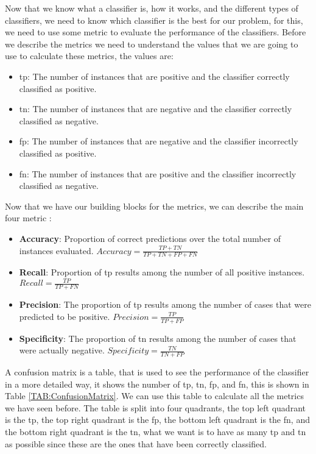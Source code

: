 Now that we know what a classifier is, how it works, and the different types of classifiers, we need to know which classifier is the best for our problem, for this, we need to use some metric to evaluate the performance of the classifiers. Before we describe the metrics we need to understand the values that we are going to use to calculate these metrics, the values are:


\begin{itemize}
    \item \ac{tp}: The number of instances that are positive and the classifier correctly classified as positive.
    \item \ac{tn}: The number of instances that are negative and the classifier correctly classified as negative.
    \item \ac{fp}: The number of instances that are negative and the classifier incorrectly classified as positive.
    \item \ac{fn}: The number of instances that are positive and the classifier incorrectly classified as negative.
\end{itemize}

Now that we have our building blocks for the metrics, we can describe the main four metric \cite{m_review_2015}:


\begin{itemize}
    \item \textbf{Accuracy}: Proportion of correct predictions over the total number of instances evaluated. $Accuracy = \frac{TP + TN}{TP + TN + FP + FN}$
    \item \textbf{Recall}: Proportion of \ac{tp} results among the number of all positive instances. $Recall = \frac{TP}{TP + FN}$
    \item \textbf{Precision}: The proportion of \ac{tp} results among the number of cases that were predicted to be positive. $Precision = \frac{TP}{TP + FP}$
    \item \textbf{Specificity}: The proportion of \ac{tn} results among the number of cases that were actually negative. $Specificity = \frac{TN}{TN + FP}$
\end{itemize}

A confusion matrix is a table, that is used to see the performance of the classifier in a more detailed way, it shows the number of \ac{tp}, \ac{tn}, \ac{fp}, and \ac{fn}, this is shown in Table \ref{TAB:ConfusionMatrix}. We can use this table to calculate all the metrics we have seen before. The table is split into four quadrants, the top left quadrant is the \ac{tp}, the top right quadrant is the \ac{fp}, the bottom left quadrant is the \ac{fn}, and the bottom right quadrant is the \ac{tn}, what we want is to have as many \ac{tp} and \ac{tn} as possible since these are the ones that have been correctly classified.

